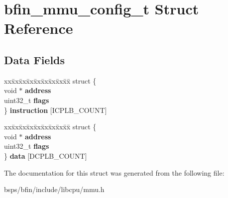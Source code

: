 \hypertarget{structbfin__mmu__config__t}{}\section{bfin\+\_\+mmu\+\_\+config\+\_\+t Struct Reference}
\label{structbfin__mmu__config__t}
\subsection*{Data Fields}
\begin{DoxyCompactItemize}
\item 
\mbox{\label{structbfin__mmu__config__t_ac868a864dc93b4c77e9c76f5589e4572}} 
\begin{tabbing}
xx\=xx\=xx\=xx\=xx\=xx\=xx\=xx\=xx\=\kill
struct \{\\
\>void $\ast$ {\bfseries address}\\
\>uint32\_t {\bfseries flags}\\
\} {\bfseries instruction} \mbox{[}ICPLB\_COUNT\mbox{]}\\

\end{tabbing}\item 
\mbox{\label{structbfin__mmu__config__t_a6f14ec21a2ec6b243d116af480610d2e}} 
\begin{tabbing}
xx\=xx\=xx\=xx\=xx\=xx\=xx\=xx\=xx\=\kill
struct \{\\
\>void $\ast$ {\bfseries address}\\
\>uint32\_t {\bfseries flags}\\
\} {\bfseries data} \mbox{[}DCPLB\_COUNT\mbox{]}\\

\end{tabbing}\end{DoxyCompactItemize}


The documentation for this struct was generated from the following file\+:\begin{DoxyCompactItemize}
\item 
bsps/bfin/include/libcpu/mmu.\+h\end{DoxyCompactItemize}
